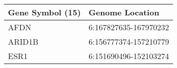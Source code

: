 \begin{tabular}{ll}
\toprule
Gene Symbol (15) &       Genome Location \\
\midrule
            AFDN & 6:167827635-167970232 \\
          ARID1B & 6:156777374-157210779 \\
            ESR1 & 6:151690496-152103274 \\
\bottomrule
\end{tabular}
